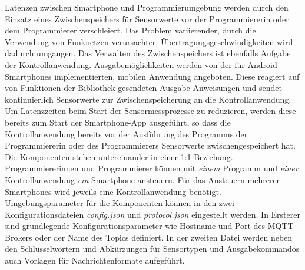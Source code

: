 \documentclass[11pt,a4paper]{report}
\begin{document}
Latenzen zwischen Smartphone und Programmierumgebung werden durch den Einsatz eines Zwischenspeichers für Sensorwerte vor der Programmiererin oder dem Programmierer verschleiert.
Das Problem variierender, durch die Verwendung von Funknetzen verursachter, Übertragungsgeschwindigkeiten wird dadurch umgangen.
Das Verwalten des Zwischenspeichers ist ebenfalls Aufgabe der Kontrollanwendung.
Ausgabemöglichkeiten werden von der für Android-Smartphones implementierten, mobilen Anwendung angeboten.
Diese reagiert auf von Funktionen der Bibliothek gesendeten Ausgabe-Anweisungen und sendet kontinuierlich Sensorwerte zur Zwischenspeicherung an die Kontrollanwendung.
Um Latenzzeiten beim Start der Sensormessprozesse zu reduzieren, werden diese bereits zum Start der Smartphone-App ausgeführt, so dass die Kontrollanwendung bereits vor der Ausführung des Programms der Programmiererin oder des Programmierers Sensorwerte zwischengespeichert hat.
Die Komponenten stehen untereinander in einer 1:1-Beziehung.
Programmiererinnen und Programmierer können mit \textit{einem} Programm und \textit{einer} Kontrollanwendung \textit{ein} Smartphone ansteuern.
Für das Ansteuern mehrerer Smartphones wird jeweils eine Kontrollanwendung benötigt.
Umgebungsparameter für die Komponenten können in den zwei Konfigurationsdateien \textit{config.json} und \textit{protocol.json} eingestellt werden.
In Ersterer sind grundlegende Konfigurationsparameter wie Hostname und Port des MQTT-Brokers oder der Name des Topics definiert.
In der zweiten Datei werden neben den Schlüsselwörtern und Abkürzungen für Sensortypen und Ausgabekommandos auch Vorlagen für Nachrichtenformate aufgeführt.
\end{document}
